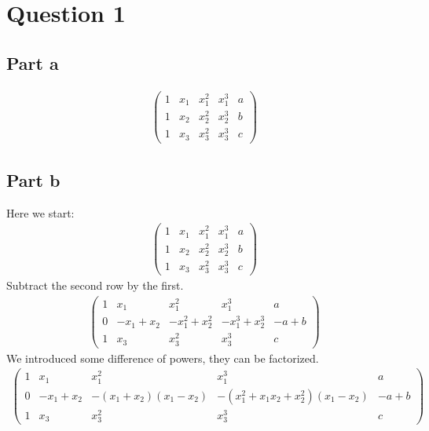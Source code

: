 \section*{Question 1}
\subsection*{Part a}
\begin{eqnarray*}
\left(\begin{array}{rrrr|r}
1 & x_{1} & x_{1}^{2} & x_{1}^{3} & a \\
1 & x_{2} & x_{2}^{2} & x_{2}^{3} & b \\
1 & x_{3} & x_{3}^{2} & x_{3}^{3} & c
\end{array}\right)
\end{eqnarray*}
\subsection*{Part b}
Here we start:
\begin{eqnarray*}
\left(\begin{array}{rrrr|r}
1 & x_{1} & x_{1}^{2} & x_{1}^{3} & a \\
1 & x_{2} & x_{2}^{2} & x_{2}^{3} & b \\
1 & x_{3} & x_{3}^{2} & x_{3}^{3} & c
\end{array}\right)
\end{eqnarray*}
Subtract the second row by the first.
\begin{eqnarray*}
\left(\begin{array}{rrrr|r}
1 & x_{1} & x_{1}^{2} & x_{1}^{3} & a \\
0 & -x_{1} + x_{2} & -x_{1}^{2} + x_{2}^{2} & -x_{1}^{3} + x_{2}^{3} & -a + b \\
1 & x_{3} & x_{3}^{2} & x_{3}^{3} & c
\end{array}\right)
\end{eqnarray*}
We introduced some difference of powers, they can be factorized.
\begin{eqnarray*}
\left(\begin{array}{rrrr|r}
1 & x_{1} & x_{1}^{2} & x_{1}^{3} & a \\
0 & -x_{1} + x_{2} & -{\left(x_{1} + x_{2}\right)} {\left(x_{1} - x_{2}\right)} & -{\left(x_{1}^{2} + x_{1} x_{2} + x_{2}^{2}\right)} {\left(x_{1} - x_{2}\right)} & -a + b \\
1 & x_{3} & x_{3}^{2} & x_{3}^{3} & c
\end{array}\right)
\end{eqnarray*}
